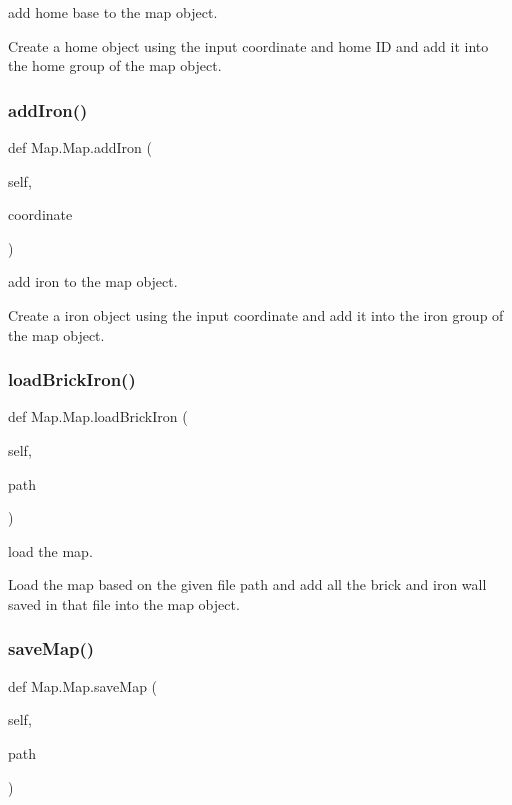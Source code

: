 add home base to the map object. 

Create a home object using the input coordinate and home ID and add it into the home group of the map object. \mbox{\label{class_map_1_1_map_a39480d6d0752ceb6395862074222b3b4}} 
\subsubsection{\texorpdfstring{addIron()}{addIron()}}
{\footnotesize\ttfamily def Map.\+Map.\+add\+Iron (\begin{DoxyParamCaption}\item[{}]{self,  }\item[{}]{coordinate }\end{DoxyParamCaption})}



add iron to the map object. 

Create a iron object using the input coordinate and add it into the iron group of the map object. \mbox{\label{class_map_1_1_map_a2338f8ecffd7308bb8fbaa2fb76b4e45}} 
\subsubsection{\texorpdfstring{loadBrickIron()}{loadBrickIron()}}
{\footnotesize\ttfamily def Map.\+Map.\+load\+Brick\+Iron (\begin{DoxyParamCaption}\item[{}]{self,  }\item[{}]{path }\end{DoxyParamCaption})}



load the map. 

Load the map based on the given file path and add all the brick and iron wall saved in that file into the map object. \mbox{\label{class_map_1_1_map_a6ea2d6c6c1d7b6db6641c1ef00f59e85}} 
\subsubsection{\texorpdfstring{saveMap()}{saveMap()}}
{\footnotesize\ttfamily def Map.\+Map.\+save\+Map (\begin{DoxyParamCaption}\item[{}]{self,  }\item[{}]{path }\end{DoxyParamCaption})}



